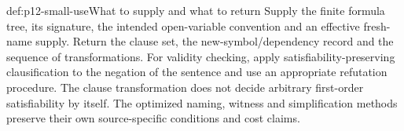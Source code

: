 \begin{hbmethod}{def:p12-small-use}{What to supply and what to return}
Supply the finite formula tree, its signature, the intended open-variable
convention and an effective fresh-name supply. Return the clause set,
the new-symbol/dependency record and the sequence of transformations.
For validity checking, apply satisfiability-preserving clausification
to the negation of the sentence and use an appropriate refutation
procedure. The clause transformation does not decide arbitrary
first-order satisfiability by itself.
The optimized naming, witness and simplification methods preserve
their own source-specific conditions and cost claims.
\end{hbmethod}
